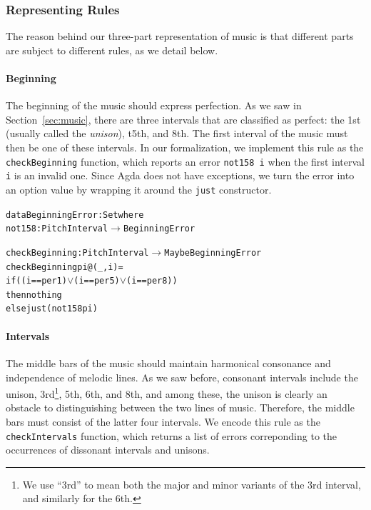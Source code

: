 \subsubsection{Representing Rules}

The reason behind our three-part representation of music is that
different parts are subject to different rules, as we detail below.

\paragraph{Beginning}

The beginning of the music should express perfection.
As we saw in Section~\ref{sec:music}, there are three intervals that
are classified as perfect: the 1st (usually called the \emph{unison}),
t5th, and 8th.
The first interval of the music must then be one of these intervals.
In our formalization, we implement this rule as the
\texttt{checkBeginning} function, which reports an error
\texttt{not158 i} when the first interval \texttt{i} is an invalid one.
Since Agda does not have exceptions, we turn the error into an option
value by wrapping it around the \texttt{just} constructor.

\begin{alltt}
data BeginningError : Set where
  not158   : PitchInterval \(\rightarrow\) BeginningError
  
checkBeginning : PitchInterval \(\rightarrow\) Maybe BeginningError
checkBeginning pi@(_ , i) =
  if ((i == per1) \(\vee\) (i == per5) \(\vee\) (i == per8))
  then nothing
  else just (not158 pi)
\end{alltt}

\paragraph{Intervals}

The middle bars of the music should maintain harmonical consonance
and independence of melodic lines.
As we saw before, consonant intervals include the unison,
3rd\footnote{We use ``3rd'' to mean both the major and minor variants
of the 3rd interval, and similarly for the 6th.}, 5th, 6th, and 8th,
and among these, the unison is clearly an obstacle to distinguishing
between the two lines of music.
Therefore, the middle bars must consist of the latter four intervals.
We encode this rule as the \texttt{checkIntervals} function, which
returns a list of errors correponding to the occurrences of dissonant
intervals and unisons.

